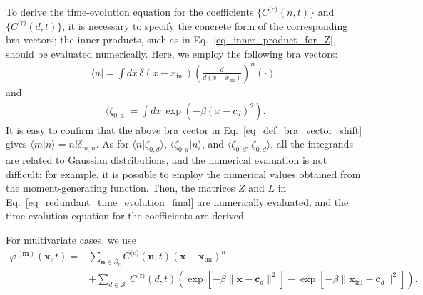 \documentclass[sn-mathphys,Numbered]{sn-jnl}%
\theoremstyle{thmstyleone}%
\theoremstyle{thmstyletwo}%
\theoremstyle{thmstylethree}%
\begin{document}
To derive the time-evolution equation for the coefficients $\{C^{\textrm{(c)}}(n,t)\}$ and $\{C^{\textrm{(r)}}(d,t)\}$, it is necessary to specify the concrete form of the corresponding bra vectors; the inner products, such as in Eq.~\eqref{eq_inner_product_for_Z}, should be evaluated numerically. Here, we employ the following bra vectors:
\begin{align}
\langle n | = \int dx \, \delta(x-x_\mathrm{ini}) \left( \frac{d}{d(x-x_\mathrm{ini})} \right)^n (\cdot),
\label{eq_def_bra_vector_shift}
\end{align}
and 
\begin{align}
\langle \zeta_{0,d} | = \int dx \, \exp\left( - \beta ( x - c_d )^2 \right).
\end{align}
It is easy to confirm that the above bra vector in Eq.~\eqref{eq_def_bra_vector_shift} gives $\langle m | n \rangle = n! \delta_{m,n}$. As for $\langle n | \zeta_{0,d} \rangle$, $\langle \zeta_{0,d} | n \rangle$, and $\langle \zeta_{0,d'} | \zeta_{0,d} \rangle$, all the integrands are related to Gaussian distributions, and the numerical evaluation is not difficult; for example, it is possible to employ the numerical values obtained from the moment-generating function. Then, the matrices $Z$ and $L$ in Eq.~\eqref{eq_redundant_time_evolution_final} are numerically evaluated, and the time-evolution equation for the coefficients are derived. 



For multivariate cases, we use
\begin{align}
\varphi^{(\bm{m})}(\bm{x},t)
= &\sum_{\bm{n} \in \mathcal{S}_{\textrm{c}}} C^{\textrm{(c)}}(\bm{n},t) \left(\bm{x} - \bm{x}_{\mathrm{ini}}\right)^{n} \nonumber \\
&+ \sum_{d\in \mathcal{S}_{\textrm{r}}}  C^{\textrm{(r)}}(d,t) \left( \exp\left[ -\beta \| \bm{x} - \bm{c}_d \|^2 \right] - \exp\left[ -\beta \| \bm{x}_{\mathrm{ini}} - \bm{c}_d \|^2 \right] \right).
\end{align}
\end{document}
